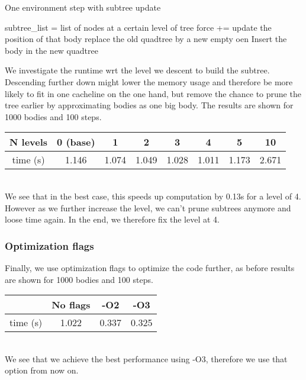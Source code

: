 \documentclass[a4paper]{scrartcl}
\begin{document}
            \begin{algorithm}[H]
                \caption{One environment step with subtree update}
                \begin{algorithmic}[1]
                \State subtree\_list = list of nodes at a certain level of tree
                    \State force += 
                    \EndFor
                \EndFor
                \State update the position of that body
                \EndFor
                \State replace the old quadtree by a new empty oen
                \State Insert the body in the new quadtree
                \EndFor
                \EndProcedure
                \end{algorithmic}
            \end{algorithm}
            We investigate the runtime wrt the level we descent to build the
            subtree. Descending further down might lower the memory usage and
            therefore be more likely to fit in one cacheline on the one hand,
            but remove the chance to prune the tree earlier by approximating
            bodies as one big body. The results are shown for 1000 bodies and
            100 steps.\\

            \noindent\begin{tabular}{c|c|c|c|c|c|c|c}
                N levels & 0 (base) & 1 & 2 & 3 & 4 & 5 & 10 \\
                \hline
                time (s) &  1.146 & 1.074 & 1.049 & 1.028 & 1.011 & 1.173 & 2.671\\
            \end{tabular}\\

            We see that in the best case, this speeds up computation by 0.13s
            for a level of 4. However as we further increase the level, we can't
            prune subtrees anymore and loose time again. In the end, we
            therefore fix the level at 4.

        \subsubsection{Optimization flags}
            Finally, we use optimization flags to optimize the code further, as
            before results are shown for 1000 bodies and 100 steps.\\
            \noindent\begin{tabular}{c|c|c|c}
                 & No flags & -O2 & -O3 \\
                \hline
                time (s) & 1.022 & 0.337 & 0.325\\ 
            \end{tabular}\\
            We see that we achieve the best performance using -O3, therefore we
            use that option from now on.
\end{document}
